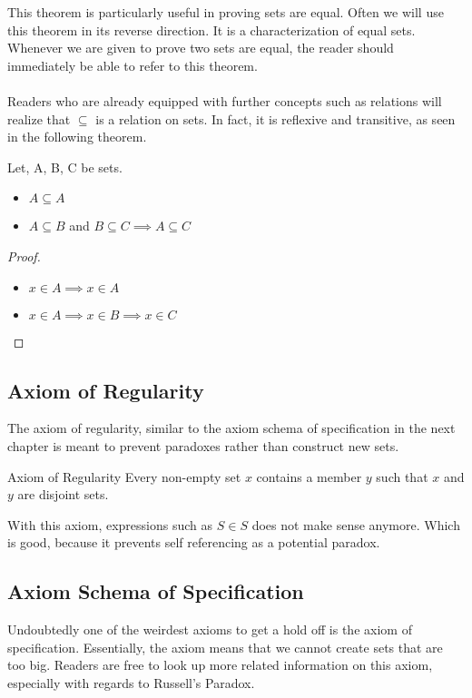 \documentclass[a4paper]{article}
\begin{document}
This theorem is particularly useful in proving sets are equal. Often we will use this theorem in its reverse direction. It is a characterization of equal sets. Whenever we are given to prove two sets are equal, the reader should immediately be able to refer to this theorem. \\~\\
Readers who are already equipped with further concepts such as relations will realize that $\subseteq$ is a relation on sets. In fact, it is reflexive and transitive, as seen in the following theorem. 
\begin{thm}{}{} Let, A, B, C be sets. 
\begin{itemize}
\item $A\subseteq A$
\item $A\subseteq B$ and $B\subseteq C\implies A\subseteq C$
\end{itemize}\tcbline
\begin{proof}~\\
\begin{itemize}
\item $x\in A\implies x\in A$
\item $x\in A\implies x\in B\implies x\in C$
\end{itemize}
\end{proof}
\end{thm}

\subsection{Axiom of Regularity}
The axiom of regularity, similar to the axiom schema of specification in the next chapter is meant to prevent paradoxes rather than construct new sets. 

\begin{axm}{Axiom of Regularity}{} Every non-empty set $x$ contains a member $y$ such that $x$ and $y$ are disjoint sets. 
\end{axm}

With this axiom, expressions such as $S\in S$ does not make sense anymore. Which is good, because it prevents self referencing as a potential paradox. 

\subsection{Axiom Schema of Specification}
Undoubtedly one of the weirdest axioms to get a hold off is the axiom of specification. Essentially, the axiom means that we cannot create sets that are too big. Readers are free to look up more related information on this axiom, especially with regards to Russell's Paradox. 
\end{document}
